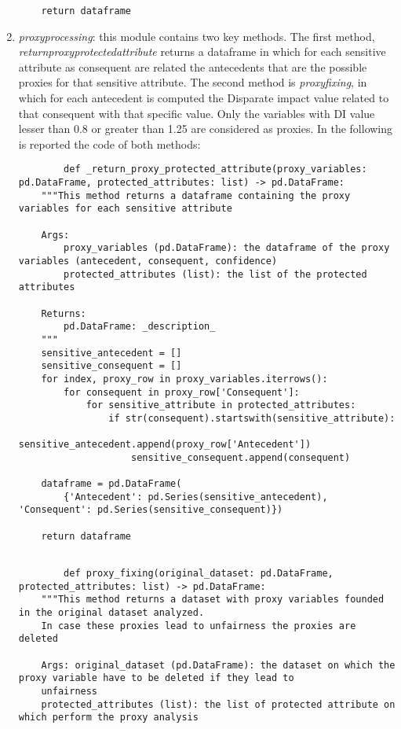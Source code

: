 \documentclass[12pt,a4paper,openright,twoside]{book}
\begin{document}
\begin{enumerate}
\begin{lstlisting}
    return dataframe
    \end{lstlisting}
    \item \emph{proxy\textunderscore processing}: this module contains two key methods. The first method, \emph{\textunderscore return\textunderscore proxy\textunderscore protected\textunderscore attribute} returns a dataframe in which for each sensitive attribute as consequent are related the antecedents that are the possible proxies for that sensitive attribute. The second method is \emph{proxy\textunderscore fixing}, in which for each antecedent is computed the Disparate impact value related to that consequent with that specific value. Only the variables with DI value lesser than 0.8 or greater than 1.25 are considered as proxies. In the following is reported the code of both methods:
    \begin{lstlisting}
        def _return_proxy_protected_attribute(proxy_variables: pd.DataFrame, protected_attributes: list) -> pd.DataFrame:
    """This method returns a dataframe containing the proxy variables for each sensitive attribute

    Args:
        proxy_variables (pd.DataFrame): the dataframe of the proxy variables (antecedent, consequent, confidence)
        protected_attributes (list): the list of the protected attributes

    Returns:
        pd.DataFrame: _description_
    """
    sensitive_antecedent = []
    sensitive_consequent = []
    for index, proxy_row in proxy_variables.iterrows():
        for consequent in proxy_row['Consequent']:
            for sensitive_attribute in protected_attributes:
                if str(consequent).startswith(sensitive_attribute):
                    sensitive_antecedent.append(proxy_row['Antecedent'])
                    sensitive_consequent.append(consequent)

    dataframe = pd.DataFrame(
        {'Antecedent': pd.Series(sensitive_antecedent), 'Consequent': pd.Series(sensitive_consequent)})

    return dataframe


    \end{lstlisting}
    \begin{lstlisting}
        def proxy_fixing(original_dataset: pd.DataFrame, protected_attributes: list) -> pd.DataFrame:
    """This method returns a dataset with proxy variables founded in the original dataset analyzed.
    In case these proxies lead to unfairness the proxies are deleted

    Args: original_dataset (pd.DataFrame): the dataset on which the proxy variable have to be deleted if they lead to
    unfairness
    protected_attributes (list): the list of protected attribute on which perform the proxy analysis


\end{lstlisting}
\end{enumerate}
\end{document}
